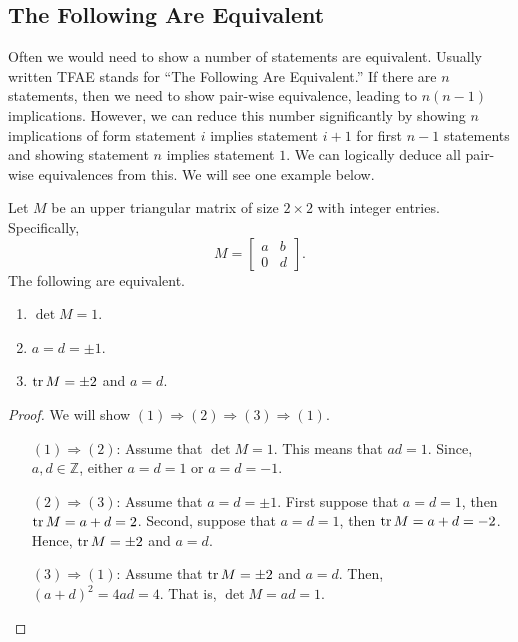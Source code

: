 \documentclass[a4paper,english,12pt]{article}
\begin{document}
\subsection{The Following Are Equivalent}
Often we would need to show a number of statements are equivalent. Usually written TFAE stands for ``The Following Are Equivalent.'' If there are $n$ statements, then we need to show pair-wise equivalence, leading to $n(n-1)$ implications. However, we can reduce this number significantly by showing $n$ implications of form statement $i$ implies statement $i+1$ for first $n-1$ statements and showing statement $n$ implies statement $1$. We can logically deduce all pair-wise equivalences from this. We will see one example below.
\begin{thm} Let $M$ be an upper triangular matrix of size $2 \times 2$ with integer entries. Specifically, 
\begin{equation*}
M = \left[\begin{array}{cc}a & b\\0&d\end{array}\right].
\end{equation*}
The following are equivalent.
\begin{enumerate}
\item $\det M = 1$.
\item $a = d = \pm 1$.
\item $\operatorname{tr} M = \pm 2$ and $a=d$.
\end{enumerate}
\end{thm}
\begin{proof} We will show $(1) \Rightarrow (2) \Rightarrow (3) \Rightarrow (1)$.
\begin{itemize}
	\item[$(1) \Rightarrow (2)$:] Assume that $\det M = 1$. This means that $ad = 1$. Since, $a,d \in \mathbb{Z}$, either $a = d = 1$ or $a = d = -1$.
	\item[$(2) \Rightarrow (3)$:] Assume that $a = d = \pm 1$. First suppose that $a = d = 1$, then $\operatorname{tr} M = a + d = 2$. Second, suppose that $a = d = 1$, then $\operatorname{tr} M = a + d = -2$. Hence, $\operatorname{tr} M = \pm 2$ and $a = d$.
	\item[$(3) \Rightarrow (1)$:] Assume that $\operatorname{tr} M = \pm 2$ and $a = d$. Then, $(a+d)^2 = 4ad = 4$. That is, $\det M = ad = 1$.
\end{itemize}
\end{proof}
\end{document}
